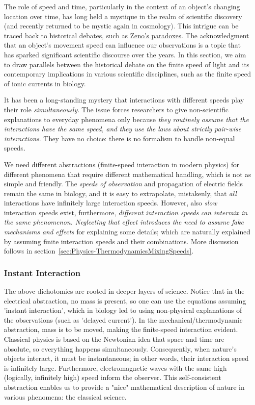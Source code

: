 {
The role of speed and time, particularly in
the context of an object's changing location over time, has long held
a mystique in the realm of scientific discovery (and recently returned
to be mystic again in cosmology). This intrigue can
be traced back to historical debates, such as \href{https://en.wikipedia.org/wiki/Zeno's_paradoxes}{Zeno's paradoxes}. The
acknowledgment that an object's movement speed can influence our
observations is a topic that has sparked significant scientific discourse
over the years. In this section, we aim to draw parallels between
the historical debate on the finite speed of light and its contemporary
implications in various scientific disciplines, such as the finite
speed of ionic currents in biology.

It has been a long-standing mystery that interactions with different speeds play
their role \textit{simultaneously}. The issue forces researchers to give
non-scientific explanations to everyday phenomena only because \textit{they
routinely assume that the interactions have the same speed, and they use
the laws about strictly pair-wise interactions}. They have no choice: 
there is no formalism to handle non-equal speeds. 
}

We need different abstractions (finite-speed interaction in
modern physics) for different phenomena that require different mathematical
handling, which is not as simple and friendly. The \textit{speeds of
observation} and propagation of electric fields remain the same in
biology, and it is easy to extrapolate, mistakenly, that \textit{all}
interactions have infinitely large interaction speeds. However, also
\textit{slow} interaction speeds exist, furthermore, \textit{different interaction speeds
can intermix in the same phenomenon. Neglecting that effect introduces
the need to assume fake mechanisms and effects} for explaining
some details; which are naturally explained by assuming finite interaction
speeds and their combinations. More discussion follows in section~\ref{sec:Physics-ThermodynamicsMixingSpeeds}.

\subsubsection{Instant Interaction\label{sec:Physics-Instant}}


The above dichotomies are rooted in deeper layers of science.
Notice that in the electrical abstraction, no mass is present,
so one can use the equations assuming 'instant interaction',
which in biology led to using non-physical explanations of the observations (such as 'delayed current').
In the mechanical/thermodynamic abstraction, mass is to be moved, 
making the finite-speed interaction evident.
Classical physics is based on the Newtonian idea that space and time are absolute, so everything happens simultaneously. Consequently, when nature's objects
interact, it must be instantaneous; in other words, their
interaction speed is infinitely large. Furthermore, electromagnetic
waves with the same high (logically, infinitely high) speed inform the observer. This
self-consistent abstraction enables us to provide a "nice"
mathematical description of nature in various phenomena: the classical
science.

